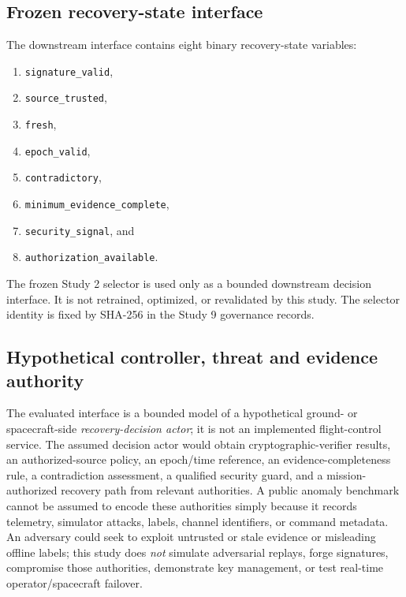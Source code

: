 \documentclass[preprint,12pt]{elsarticle}
\begin{document}
\subsection{Frozen recovery-state interface}

The downstream interface contains eight binary recovery-state variables:
\begin{enumerate}[label=(\arabic*)]
    \item \texttt{signature\_valid},
    \item \texttt{source\_trusted},
    \item \texttt{fresh},
    \item \texttt{epoch\_valid},
    \item \texttt{contradictory},
    \item \texttt{minimum\_evidence\_complete},
    \item \texttt{security\_signal}, and
    \item \texttt{authorization\_available}.
\end{enumerate}

The frozen Study 2 selector is used only as a bounded downstream decision interface. It is not retrained, optimized, or revalidated by this study. The selector identity is fixed by SHA-256 in the Study 9 governance records.

\subsection{Hypothetical controller, threat and evidence authority}
The evaluated interface is a bounded model of a hypothetical ground- or spacecraft-side \emph{recovery-decision actor}; it is not an implemented flight-control service. The assumed decision actor would obtain cryptographic-verifier results, an authorized-source policy, an epoch/time reference, an evidence-completeness rule, a contradiction assessment, a qualified security guard, and a mission-authorized recovery path from relevant authorities. A public anomaly benchmark cannot be assumed to encode these authorities simply because it records telemetry, simulator attacks, labels, channel identifiers, or command metadata. An adversary could seek to exploit untrusted or stale evidence or misleading offline labels; this study does \emph{not} simulate adversarial replays, forge signatures, compromise those authorities, demonstrate key management, or test real-time operator/spacecraft failover.
\end{document}
